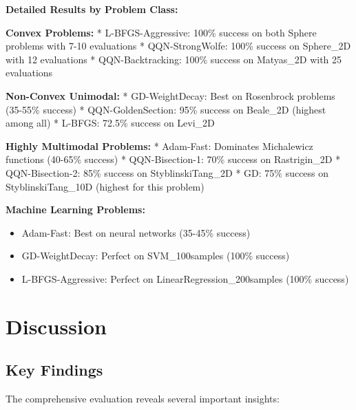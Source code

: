 \textbf{Detailed Results by Problem Class:}

\textbf{Convex Problems:}
* L-BFGS-Aggressive: 100\% success on both Sphere problems with 7-10 evaluations
* QQN-StrongWolfe: 100\% success on Sphere\_2D with 12 evaluations
* QQN-Backtracking: 100\% success on Matyas\_2D with 25 evaluations

\textbf{Non-Convex Unimodal:}
* GD-WeightDecay: Best on Rosenbrock problems (35-55\% success)
* QQN-GoldenSection: 95\% success on Beale\_2D (highest among all)
* L-BFGS: 72.5\% success on Levi\_2D

\textbf{Highly Multimodal Problems:}
* Adam-Fast: Dominates Michalewicz functions (40-65\% success)
* QQN-Bisection-1: 70\% success on Rastrigin\_2D
* QQN-Bisection-2: 85\% success on StyblinskiTang\_2D
* GD: 75\% success on StyblinskiTang\_10D (highest for this problem)

\textbf{Machine Learning Problems:}

\begin{itemize}
\tightlist
\item
  Adam-Fast: Best on neural networks (35-45\% success)
\item
  GD-WeightDecay: Perfect on SVM\_100samples (100\% success)
\item
  L-BFGS-Aggressive: Perfect on LinearRegression\_200samples (100\% success)
\end{itemize}

\hypertarget{discussion}{%
\section{Discussion}\label{discussion}}

\hypertarget{key-findings}{%
\subsection{Key Findings}\label{key-findings}}

The comprehensive evaluation reveals several important insights:

